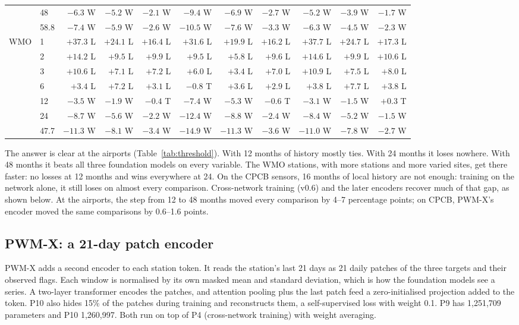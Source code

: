 \begin{table}[t]
\begin{tabular}{@{}llrrrrrrrrr@{}}
 & 48 & $-6.3$ W & $-5.2$ W & $-2.1$ W & $-9.4$ W & $-6.9$ W & $-2.7$ W & $-5.2$ W & $-3.9$ W & $-1.7$ W \\
 & 58.8 & $-7.4$ W & $-5.9$ W & $-2.6$ W & $-10.5$ W & $-7.6$ W & $-3.3$ W & $-6.3$ W & $-4.5$ W & $-2.3$ W \\
\midrule
\multirow{7}{*}{WMO} & 1 & $+37.3$ L & $+24.1$ L & $+16.4$ L & $+31.6$ L & $+19.9$ L & $+16.2$ L & $+37.7$ L & $+24.7$ L & $+17.3$ L \\
 & 2 & $+14.2$ L & $+9.5$ L & $+9.9$ L & $+9.5$ L & $+5.8$ L & $+9.6$ L & $+14.6$ L & $+9.9$ L & $+10.6$ L \\
 & 3 & $+10.6$ L & $+7.1$ L & $+7.2$ L & $+6.0$ L & $+3.4$ L & $+7.0$ L & $+10.9$ L & $+7.5$ L & $+8.0$ L \\
 & 6 & $+3.4$ L & $+7.2$ L & $+3.1$ L & $-0.8$ T & $+3.6$ L & $+2.9$ L & $+3.8$ L & $+7.7$ L & $+3.8$ L \\
 & 12 & $-3.5$ W & $-1.9$ W & $-0.4$ T & $-7.4$ W & $-5.3$ W & $-0.6$ T & $-3.1$ W & $-1.5$ W & $+0.3$ T \\
 & 24 & $-8.7$ W & $-5.6$ W & $-2.2$ W & $-12.4$ W & $-8.8$ W & $-2.4$ W & $-8.4$ W & $-5.2$ W & $-1.5$ W \\
 & 47.7 & $-11.3$ W & $-8.1$ W & $-3.4$ W & $-14.9$ W & $-11.3$ W & $-3.6$ W & $-11.0$ W & $-7.8$ W & $-2.7$ W \\
\bottomrule
\end{tabular}
\end{table}

The answer is clear at the airports (Table~\ref{tab:threshold}). With 12 months of history \pwm mostly ties. With
24 months it loses nowhere. With 48 months it beats all three foundation models on every variable. The WMO stations, with more
stations and more varied sites, get there faster: no losses at 12 months and wins everywhere at 24. On the CPCB
sensors, 16 months of local history are not enough: training on the network alone, it still loses on almost every
comparison. Cross-network training (v0.6) and the later encoders recover much of that gap, as shown below. At the airports,
the step from 12 to 48 months moved every comparison by 4--7 percentage points; on CPCB, PWM-X's encoder moved the
same comparisons by 0.6--1.6 points.

\subsection{PWM-X: a 21-day patch encoder}

PWM-X adds a second encoder to each station token. It reads the station's last 21 days as 21 daily patches of
the three targets and their observed flags. Each window is normalised by its own masked mean and standard deviation,
which is how the foundation models see a series. A two-layer transformer encodes the patches, and attention pooling
plus the last patch feed a zero-initialised projection added to the token. P10 also hides 15\% of the patches during
training and reconstructs them, a self-supervised loss with weight 0.1. P9 has 1,251,709 parameters and P10
1,260,997. Both run on top of P4 (cross-network training) with weight averaging.

